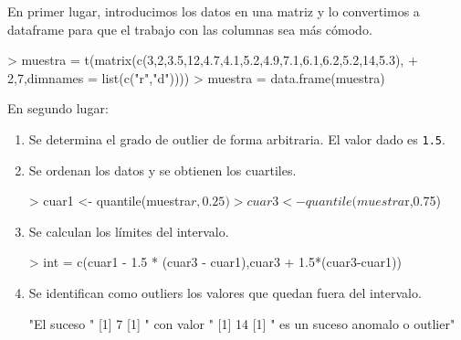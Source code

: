 \documentclass [a4paper] {article}
\begin{document}
\bigskip
En primer lugar, introducimos los datos en una matriz y lo convertimos a dataframe para que el trabajo con las 
columnas sea más cómodo.
\begin{Schunk}
\begin{Sinput}
> muestra = t(matrix(c(3,2,3.5,12,4.7,4.1,5.2,4.9,7.1,6.1,6.2,5.2,14,5.3),
+         2,7,dimnames = list(c("r","d"))))
> muestra = data.frame(muestra)
\end{Sinput}
\end{Schunk}

\bigskip
En segundo lugar:
\begin{enumerate}
\item Se determina el grado de outlier de forma arbitraria. El valor dado es \texttt{1.5}.
\item Se ordenan los datos y se obtienen los cuartiles.
\begin{Schunk}
\begin{Sinput}
> cuar1 <- quantile(muestra$r,0.25)
> cuar3 <- quantile(muestra$r,0.75)
\end{Sinput}
\end{Schunk}

\item Se calculan los límites del intervalo.
\begin{Schunk}
\begin{Sinput}
> int = c(cuar1 - 1.5 * (cuar3 - cuar1),cuar3 + 1.5*(cuar3-cuar1))
\end{Sinput}
\end{Schunk}

\item Se identifican como outliers los valores que quedan fuera del intervalo.
\begin{Schunk}
\begin{Soutput}
[1] "El suceso "
[1] 7
[1] " con valor "
[1] 14
[1] " es un suceso anomalo o outlier"
\end{Soutput}
\end{Schunk}
\end{enumerate}
\end{document}
